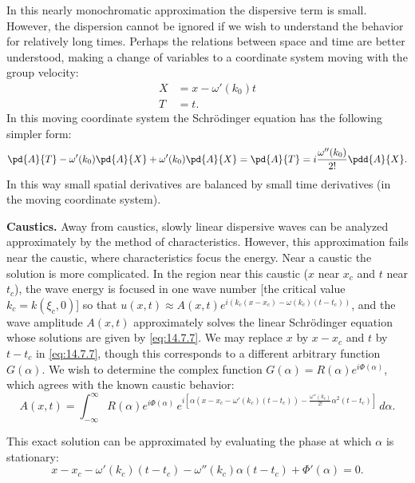 In this nearly monochromatic approximation the dispersive term is small.  However, the dispersion cannot be ignored if we wish to understand the behavior for relatively long times.  Perhaps the relations between space and time are better understood, making a change of variables to a coordinate system moving with the group velocity:
\begin{align}
\label{eq:14.7.8}
X &= x - \omega'(k_0)t \\
\label{eq:14.7.9}
T &= t.
\end{align}
In this moving coordinate system the Schr\"odinger equation has the following simpler form:
\[
\pd{A}{T} - \omega'(k_0)\pd{A}{X} + \omega'(k_0)\pd{A}{X} = \pd{A}{T} = i\frac{\omega''(k_0)}{2!}\pdd{A}{X}.
\]
In this way small spatial derivatives are balanced by small time derivatives (in the moving coordinate system).

\textbf{Caustics.}  Away from caustics, slowly linear dispersive waves can be analyzed approximately by the method of characteristics.  However, this approximation fails near the caustic, where characteristics focus the energy.  Near a caustic the solution is more complicated.  In the region near this caustic ($x$ near $x_c$ and $t$ near $t_c$), the wave energy is focused in one wave number [the critical value $k_c = k(\xi_c, 0)$] so that $u(x,t) \approx A(x,t)e^{i(k_c(x - x_c) - \omega(k_c)(t - t_c))}$, and the wave amplitude $A(x,t)$ approximately solves the linear Schr\"odinger equation whose solutions are given by \eqref{eq:14.7.7}.  We may replace $x$ by $x - x_c$ and $t$ by $t - t_c$ in \eqref{eq:14.7.7}, though this corresponds to a different arbitrary function $G(\alpha)$.  We wish to determine the complex function $G(\alpha) = R(\alpha)e^{i\Phi(\alpha)}$, which agrees with the known caustic behavior:
\begin{equation}
\label{eq:14.7.10}
A(x,t) = \int_{-\infty}^{\infty} R(\alpha)e^{i\Phi(\alpha)}\,e^{i[\alpha(x - x_c - \omega'(k_c)(t - t_c)) - \frac{\omega''(k_c)}{2!}\alpha^2(t-t_c)]}\,d\alpha.
\end{equation}

This exact solution can be approximated by evaluating the phase at which $\alpha$ is stationary:
\begin{equation}
\label{eq:14.7.11}
x - x_c - \omega'(k_c)(t - t_c) - \omega''(k_c)\alpha(t - t_c) + \Phi'(\alpha) = 0.
\end{equation}

